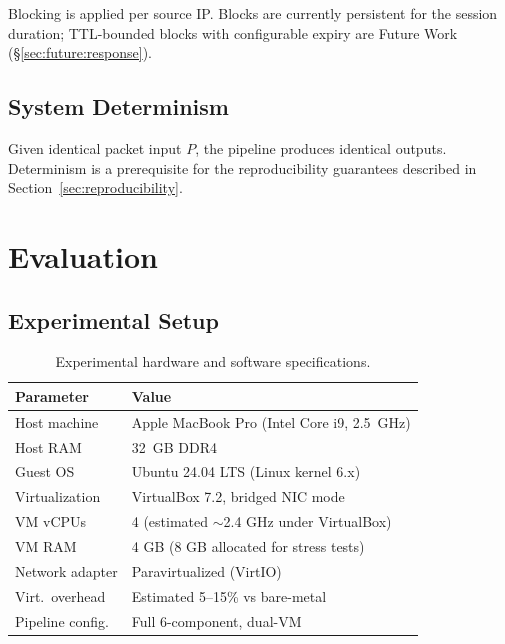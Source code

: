 \documentclass[11pt,a4paper]{article}
\begin{document}
    Blocking is applied per source IP. Blocks are currently persistent for the session duration;
    TTL-bounded blocks with configurable expiry are Future Work (\S\ref{sec:future:response}).

    \subsection{System Determinism}

    Given identical packet input $P$, the pipeline produces identical outputs. Determinism is a
    prerequisite for the reproducibility guarantees described in Section~\ref{sec:reproducibility}.

    \section{Evaluation}
    \label{sec:eval}

    \subsection{Experimental Setup}

    \begin{table}[h]
        \centering
        \caption{Experimental hardware and software specifications.}
        \label{tab:setup}
        \begin{tabular}{ll}
            \toprule
            \textbf{Parameter} & \textbf{Value} \\
            \midrule
            Host machine       & Apple MacBook Pro (Intel Core i9, 2.5~GHz) \\
            Host RAM           & 32~GB DDR4 \\
            Guest OS           & Ubuntu 24.04 LTS (Linux kernel 6.x) \\
            Virtualization     & VirtualBox 7.2, bridged NIC mode \\
            VM vCPUs           & 4 (estimated ${\sim}$2.4 GHz under VirtualBox) \\
            VM RAM             & 4 GB (8 GB allocated for stress tests) \\
            Network adapter    & Paravirtualized (VirtIO) \\
            Virt.\ overhead    & Estimated 5--15\% vs bare-metal \\
            Pipeline config.   & Full 6-component, dual-VM \\
            \bottomrule
        \end{tabular}
    \end{table}
\end{document}
